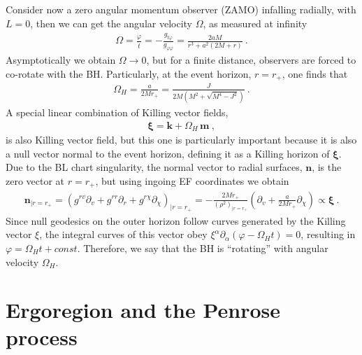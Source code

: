Consider now a zero angular momentum observer (ZAMO) infalling radially, with $L=0$, then we can get the angular velocity $\Omega$, as measured at infinity
\begin{align}
    \Omega = \frac{\dot{\varphi}}{\dot{t}} = - \frac{g_{t\varphi}}{g_{\varphi\varphi}} = \frac{2 a M}{r^3 + a^2 (2 M+r)} ~.
    \label{eq2:angMomentumZAMO}
\end{align}
Asymptotically we obtain $\Omega\to0$, but for a finite distance, observers are forced to co-rotate with the BH. 
Particularly, at the event horizon, $r=r_+$, one finds that
\begin{align}
    \Omega_H = \frac{a}{2 M r_+} = \frac{J}{2 M \left(M^2+\sqrt{M^4-J^2}\right)} ~.
    \label{eq2:angMomentumH}
\end{align}
A special linear combination of Killing vector fields,
\begin{align}
    \bm{\xi} = \bm{k} + \Omega_H \,\bm{m} ~,
    \label{eq2:KillingXi}
\end{align}
is also Killing vector field, but this one is particularly important because it is also a null vector normal to the event horizon, defining it as a Killing horizon of $\bm{\xi}$. Due to the BL chart singularity, the normal vector to radial surfaces, $\bm{n}$, is the zero vector at $r=r_{+}$, but using ingoing EF coordinates we obtain
\begin{align}
    \bm{n}_{|r=r_{+}} = \left( g^{rv} \partial_v + g^{rr} \partial_r + g^{r\chi} \partial_\chi \right)_{|r=r_{+}} = - \frac{2 M r_+}{(\rho^2)_{|r=r_+}} \left( \partial_v + \frac{a}{2 M r_+} \partial_\chi \right) \propto \bm{\xi} ~.
\end{align}
Since null geodesics on the outer horizon follow curves generated by the Killing vector $\xi$, the integral curves of this vector obey $\xi^\alpha \partial_\alpha (\varphi - \Omega_H t) = 0$, resulting in $\varphi = \Omega_H t + const$.
Therefore, we say that the BH is ``rotating'' with angular velocity $\Omega_H$.

\section{Ergoregion and the Penrose process}

